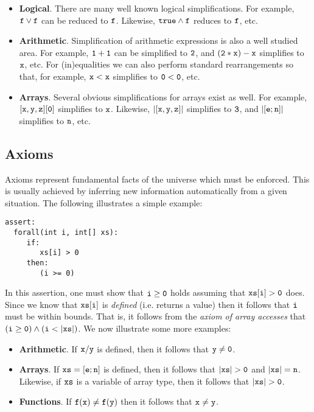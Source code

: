 \begin{itemize}
\item {\bf Logical}.  There are many well known logical
  simplifications.  For example, ${\tt f\lor f}$ can be reduced to
  ${\tt f}$.  Likewise, ${\tt true\land f}$ reduces to ${\tt f}$, etc.
\item {\bf Arithmetic}.  Simplification of arithmetic expressions is
  also a well studied area.  For example, ${\tt 1+1}$ can be
  simplified to ${\tt 2}$, and ${\tt (2*x) - x}$ simplifies to
  ${\tt x}$, etc.  For (in)equalities we can also perform standard
  rearrangements so that, for example, ${\tt x < x}$ simplifies to
  ${\tt 0 < 0}$, etc.
\item {\bf Arrays}.  Several obvious simplifications for arrays exist
  as well.  For example, ${\tt [x,y,z][0]}$ simplifies to ${\tt x}$.
  Likewise, ${\tt |[x,y,z]|}$ simplifies to ${\tt 3}$, and
  ${\tt |[e;n]|}$ simplifies to ${\tt n}$, etc.
\end{itemize}

\subsection{Axioms}

Axioms represent fundamental facts of the universe which must be
enforced.  This is usually achieved by inferring new information
automatically from a given situation.  The following illustrates a
simple example:

\begin{tcolorbox}\begin{lstlisting}[language=WyAL]
assert:
  forall(int i, int[] xs):
     if:
        xs[i] > 0
     then:
        (i >= 0)
\end{lstlisting}\end{tcolorbox}

In this assertion, one must show that ${\tt i \ge 0}$ holds assuming
that ${\tt xs[i] > 0}$ does.  Since we know that ${\tt xs[i]}$ is {\em
  defined} (i.e. returns a value) then it follows that ${\tt i}$ must
be within bounds.  That is, it follows from the {\em axiom of array
  accesses} that ${\tt (i \ge 0)\land(i < |xs|)}$.  We now illustrate
some more examples:

\begin{itemize}
\item {\bf Arithmetic}.  If ${\tt x / y}$ is defined, then it follows
  that ${\tt y \neq 0}$.
\item {\bf Arrays}.  If ${\tt xs=[e;n]}$ is defined, then it follows
  that ${\tt |xs| > 0}$ and ${\tt |xs| = n}$.  Likewise, if
  ${\tt xs}$ is a variable of array type, then it follows that
  ${\tt |xs| > 0}$.
\item {\bf Functions}.  If ${\tt f(x) \neq f(y)}$ then it follows that
  ${\tt x\neq y}$.
\end{itemize}

